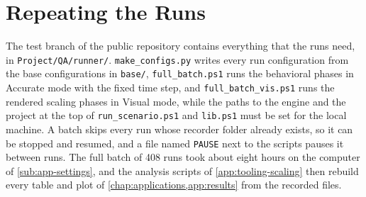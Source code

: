 \section{Repeating the Runs}\label{app:tooling-repeat}

The test branch of the public repository \citep{armada2026repository} contains everything that the runs need, in \texttt{Project/QA/runner/}. \texttt{make\_configs.py} writes every run configuration from the base configurations in \texttt{base/}, \texttt{full\_batch.ps1} runs the behavioral phases in Accurate mode with the fixed time step, and \texttt{full\_batch\_vis.ps1} runs the rendered scaling phases in Visual mode, while the paths to the engine and the project at the top of \texttt{run\_scenario.ps1} and \texttt{lib.ps1} must be set for the local machine. A batch skips every run whose recorder folder already exists, so it can be stopped and resumed, and a file named \texttt{PAUSE} next to the scripts pauses it between runs. The full batch of 408 runs took about eight hours on the computer of \cref{sub:app-settings}, and the analysis scripts of \cref{app:tooling-scaling} then rebuild every table and plot of \cref{chap:applications,app:results} from the recorded files.

\par\endgroup
